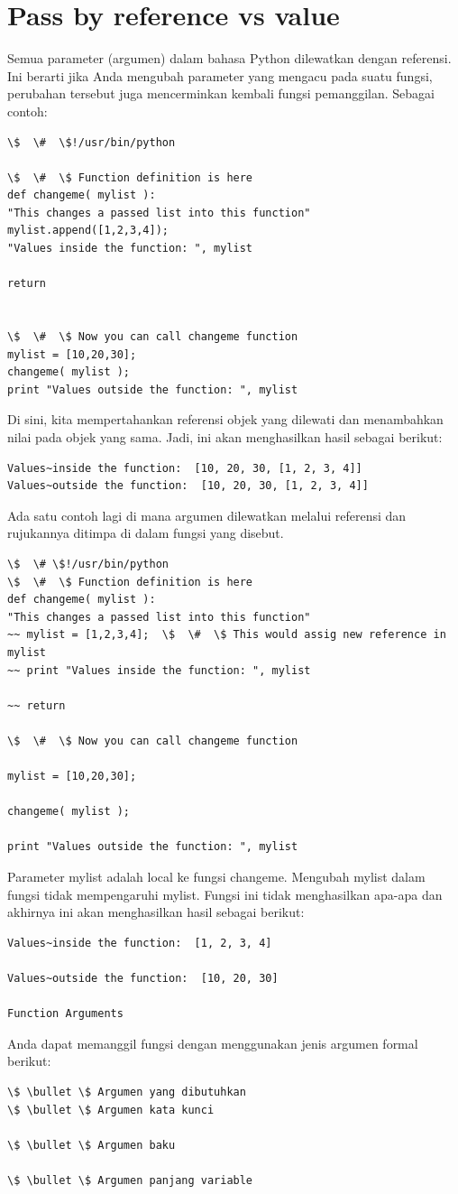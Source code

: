 \section{Pass by reference vs value}
Semua parameter (argumen) dalam bahasa Python dilewatkan dengan referensi. Ini berarti jika Anda mengubah parameter yang mengacu pada suatu fungsi, perubahan tersebut juga mencerminkan kembali fungsi pemanggilan. Sebagai contoh:
\begin{verbatim}
\$  \#  \$!/usr/bin/python 

\$  \#  \$ Function definition is here 
def changeme( mylist ): 
"This changes a passed list into this function" 
mylist.append([1,2,3,4]); 
"Values inside the function: ", mylist

return


\$  \#  \$ Now you can call changeme function 
mylist = [10,20,30]; 
changeme( mylist );
print "Values outside the function: ", mylist
\end{verbatim}
Di sini, kita mempertahankan referensi objek yang dilewati dan menambahkan nilai pada objek yang sama. Jadi, ini akan menghasilkan hasil sebagai berikut:
\begin{verbatim}
Values~inside the function:  [10, 20, 30, [1, 2, 3, 4]] 
Values~outside the function:  [10, 20, 30, [1, 2, 3, 4]] 
\end{verbatim}
Ada satu contoh lagi di mana argumen dilewatkan melalui referensi dan rujukannya ditimpa di dalam fungsi yang disebut. 
\begin{verbatim}
\$  \# \$!/usr/bin/python 
\$  \#  \$ Function definition is here 
def changeme( mylist ): 
"This changes a passed list into this function" 
~~ mylist = [1,2,3,4];  \$  \#  \$ This would assig new reference in mylist 
~~ print "Values inside the function: ", mylist 

~~ return 

\$  \#  \$ Now you can call changeme function 

mylist = [10,20,30]; 

changeme( mylist ); 

print "Values outside the function: ", mylist 
\end{verbatim}
Parameter mylist adalah local ke fungsi changeme. Mengubah mylist dalam fungsi tidak mempengaruhi mylist. Fungsi ini tidak menghasilkan apa-apa dan akhirnya ini akan menghasilkan hasil sebagai berikut: 
\begin{verbatim}
Values~inside the function:  [1, 2, 3, 4] 

Values~outside the function:  [10, 20, 30] 

Function Arguments
\end{verbatim}
Anda dapat memanggil fungsi dengan menggunakan jenis argumen formal berikut: 
\begin{verbatim}
\$ \bullet \$ Argumen yang dibutuhkan
\$ \bullet \$ Argumen kata kunci 

\$ \bullet \$ Argumen baku

\$ \bullet \$ Argumen panjang variable
\end{verbatim}
